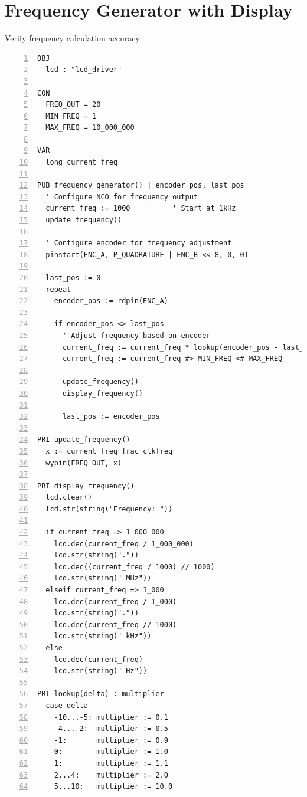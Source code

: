 \documentclass[11pt,a4paper,oneside,english]{book}
\begin{document}
\hypertarget{frequency-generator-with-display}{%
\section{Frequency Generator with
Display}\label{frequency-generator-with-display}}

Verify frequency calculation accuracy

\begin{Spin2Block}
\begin{Verbatim}[numbers=left,numbersep=5pt,xleftmargin=15pt]
OBJ
  lcd : "lcd_driver"
  
CON
  FREQ_OUT = 20
  MIN_FREQ = 1
  MAX_FREQ = 10_000_000
  
VAR
  long current_freq
  
PUB frequency_generator() | encoder_pos, last_pos
  ' Configure NCO for frequency output
  current_freq := 1000          ' Start at 1kHz
  update_frequency()
  
  ' Configure encoder for frequency adjustment
  pinstart(ENC_A, P_QUADRATURE | ENC_B << 8, 0, 0)
  
  last_pos := 0
  repeat
    encoder_pos := rdpin(ENC_A)
    
    if encoder_pos <> last_pos
      ' Adjust frequency based on encoder
      current_freq := current_freq * lookup(encoder_pos - last_pos)
      current_freq := current_freq #> MIN_FREQ <# MAX_FREQ
      
      update_frequency()
      display_frequency()
      
      last_pos := encoder_pos

PRI update_frequency()
  x := current_freq frac clkfreq
  wypin(FREQ_OUT, x)

PRI display_frequency()
  lcd.clear()
  lcd.str(string("Frequency: "))
  
  if current_freq => 1_000_000
    lcd.dec(current_freq / 1_000_000)
    lcd.str(string("."))
    lcd.dec((current_freq / 1000) // 1000)
    lcd.str(string(" MHz"))
  elseif current_freq => 1_000
    lcd.dec(current_freq / 1_000)
    lcd.str(string("."))
    lcd.dec(current_freq // 1000)
    lcd.str(string(" kHz"))
  else
    lcd.dec(current_freq)
    lcd.str(string(" Hz"))

PRI lookup(delta) : multiplier
  case delta
    -10...-5: multiplier := 0.1
    -4...-2:  multiplier := 0.5
    -1:       multiplier := 0.9
    0:        multiplier := 1.0
    1:        multiplier := 1.1
    2...4:    multiplier := 2.0
    5...10:   multiplier := 10.0
\end{Verbatim}
\end{Spin2Block}
\end{document}
